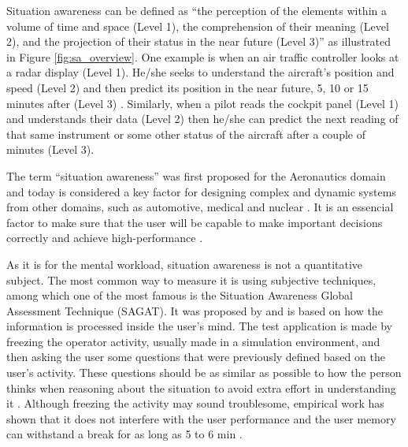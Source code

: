 Situation awareness can be defined as “the perception of the elements within a volume of time and space (Level 1), the comprehension of their meaning (Level 2), and the projection of their status in the near future (Level 3)” as illustrated in Figure \ref{fig:sa_overview}. One example is when an air traffic controller looks at a radar display (Level 1). He/she seeks to understand the aircraft's position and speed (Level 2) and then predict its position in the near future, 5, 10 or 15 minutes after (Level 3) \cite{sanders1998human}. Similarly, when a pilot reads the cockpit panel (Level 1) and understands their data (Level 2) then he/she can predict the next reading of that same instrument or some other status of the aircraft after a couple of minutes (Level 3).

The term “situation awareness” was first proposed for the Aeronautics domain and today is considered a key factor for designing complex and dynamic systems from other domains, such as automotive, medical and nuclear \cite{endsley1995measurement}. It is an essencial factor to make sure that the user will be capable to make important decisions correctly and achieve high-performance \cite{endsley1988design, endsley2018automation}.



As it is for the mental workload, situation awareness is not a quantitative subject. The most common way to measure it is using subjective techniques, among which one of the most famous is the Situation Awareness Global Assessment Technique (SAGAT). It was proposed by \cite{endsley1988design} and is based on how the information is processed inside the user’s mind. The test application is made by freezing the operator activity, usually made in a simulation environment, and then asking the user some questions that were previously defined based on the user's activity. These questions should be as similar as possible to how the person thinks when reasoning about the situation to avoid extra effort in understanding it \cite{stanton2004handbook}.  Although freezing the activity may sound troublesome, empirical work has shown that it does not interfere with the user performance and the user memory can withstand a break for as long as 5 to 6 min \cite{endsley1988design}.
